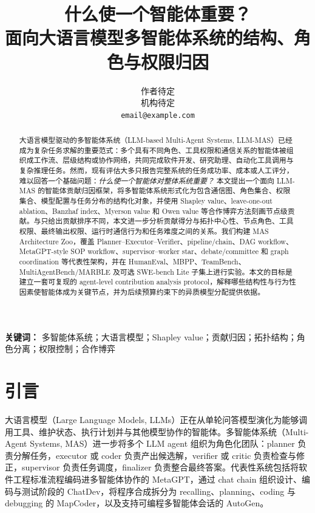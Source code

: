 \documentclass[UTF8,a4paper,11pt]{ctexart}
\title{什么使一个智能体重要？\\面向大语言模型多智能体系统的结构、角色与权限归因}
\author{作者待定 \\ 机构待定 \\ \texttt{email@example.com}}
\date{}
\begin{document}
\maketitle

\begin{abstract}
大语言模型驱动的多智能体系统（LLM-based Multi-Agent Systems, LLM-MAS）已经成为复杂任务求解的重要范式：多个具有不同角色、工具权限和通信关系的智能体被组织成工作流、层级结构或协作网络，共同完成软件开发、研究助理、自动化工具调用与复杂推理任务。然而，现有评估大多只报告完整系统的任务成功率、成本或人工评分，难以回答一个基础问题：\emph{什么使一个智能体对整体系统重要？} 本文提出一个面向 LLM-MAS 的智能体贡献归因框架，将多智能体系统形式化为包含通信图、角色集合、权限集合、模型配置与任务分布的结构化对象，并使用 Shapley value、leave-one-out ablation、Banzhaf index、Myerson value 和 Owen value 等合作博弈方法刻画节点级贡献。与只给出贡献排序不同，本文进一步分析贡献得分与拓扑中心性、节点角色、工具权限、最终输出权限、运行时通信行为和任务难度之间的关系。我们构建 MAS Architecture Zoo，覆盖 Planner--Executor--Verifier、pipeline/chain、DAG workflow、MetaGPT-style SOP workflow、supervisor--worker star、debate/committee 和 graph coordination 等代表性架构，并在 HumanEval、MBPP、TeamBench、MultiAgentBench/MARBLE 及可选 SWE-bench Lite 子集上进行实验。本文的目标是建立一套可复现的 agent-level contribution analysis protocol，解释哪些结构性与行为性因素使智能体成为关键节点，并为后续预算约束下的异质模型分配提供依据。
\end{abstract}

\noindent\textbf{关键词：} 多智能体系统；大语言模型；Shapley value；贡献归因；拓扑结构；角色分离；权限控制；合作博弈

\section{引言}

大语言模型（Large Language Models, LLMs）正在从单轮问答模型演化为能够调用工具、维护状态、执行计划并与其他模型协作的智能体。多智能体系统（Multi-Agent Systems, MAS）进一步将多个 LLM agent 组织为角色化团队：planner 负责分解任务，executor 或 coder 负责产出候选解，verifier 或 critic 负责检查与修正，supervisor 负责任务调度，finalizer 负责整合最终答案。代表性系统包括将软件工程标准流程编码进多智能体协作的 MetaGPT\cite{hong2023metagpt}，通过 chat chain 组织设计、编码与测试阶段的 ChatDev\cite{qian2023chatdev}，将程序合成拆分为 recalling、planning、coding 与 debugging 的 MapCoder\cite{islam2024mapcoder}，以及支持可编程多智能体会话的 AutoGen\cite{wu2023autogen}。
\end{document}
